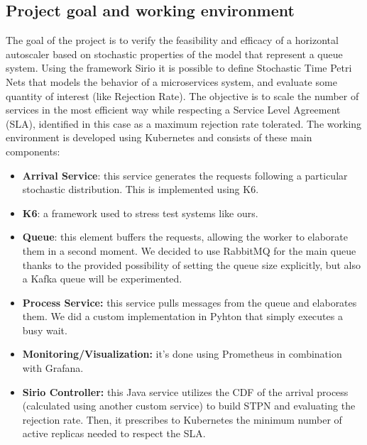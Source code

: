 \subsection{Project goal and working environment}
The goal of the project is to verify the feasibility and efficacy of a horizontal autoscaler based on stochastic properties of the model that represent a queue system. Using the framework Sirio it is possible to define Stochastic Time Petri Nets that models the behavior of a microservices system, and evaluate some quantity of interest (like Rejection Rate). The objective is to scale the number of services in the most efficient way while respecting a Service Level Agreement (SLA), identified in this case as a maximum rejection rate tolerated. The working environment is developed using Kubernetes and consists of these main components:
\begin{itemize}
    \item \textbf{Arrival Service}: this service generates the requests following a particular stochastic distribution. This is implemented using K6.

    \item \textbf{K6}: a framework used to stress test systems like ours.

    \item \textbf{Queue}: this element buffers the requests, allowing the worker to elaborate them in a second moment. We decided to use RabbitMQ for the main queue thanks to the provided possibility of setting the queue size explicitly, but also a Kafka queue will be experimented.

    \item \textbf{Process Service:} this service pulls messages from the queue and elaborates them. We did a custom implementation in Pyhton that simply executes a busy wait.
    
    \item \textbf{Monitoring/Visualization:} it’s done using Prometheus in combination with Grafana.

    \item \textbf{Sirio Controller:} this Java service utilizes the CDF of the arrival process (calculated using another custom service) to build STPN and evaluating the rejection rate. Then, it prescribes to Kubernetes the minimum number of active replicas needed to respect the SLA.
    
\end{itemize}

\clearpage
